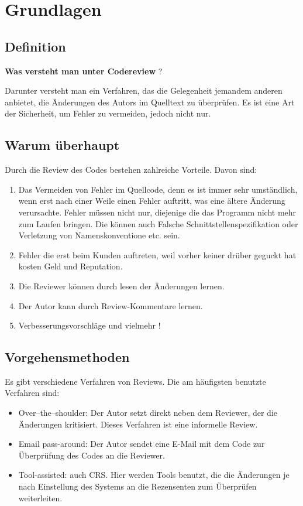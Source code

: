 \section{Grundlagen}

\subsection{Definition}

\textbf{Was versteht man unter Codereview} ?

Darunter versteht man ein Verfahren, das die Gelegenheit jemandem anderen anbietet, die Änderungen des Autors im Quelltext zu überprüfen.
Es ist eine Art der Sicherheit, um Fehler zu vermeiden, jedoch nicht nur.

\subsection{Warum überhaupt}
Durch die Review des Codes bestehen zahlreiche Vorteile. Davon sind:

\begin{enumerate}
\item Das Vermeiden von Fehler im Quellcode, denn es ist immer sehr umständlich, wenn erst nach einer Weile einen Fehler auftritt, was eine ältere Änderung verursachte.
	  Fehler müssen nicht nur, diejenige die das Programm nicht mehr zum Laufen bringen. Die können auch Falsche Schnittstellenspezifikation oder Verletzung von Namenskonventione 				  \ac{etc.} sein.
\item Fehler die erst beim Kunden auftreten, weil vorher keiner drüber geguckt hat kosten Geld und Reputation.
\item Die Reviewer können durch lesen der Änderungen lernen.
\item Der Autor kann durch Review-Kommentare lernen.
\item Verbesserungsvorschläge und vielmehr !
\end{enumerate}

\subsection{Vorgehensmethoden}
Es gibt verschiedene Verfahren von Reviews. Die am häufigsten benutzte Verfahren sind:

\begin{itemize}
\item Over–the–shoulder: Der Autor setzt direkt neben dem Reviewer, der die Änderungen kritisiert. Dieses Verfahren ist eine informelle Review.
\item Email pass-around: Der Autor sendet eine E-Mail mit dem Code zur Überprüfung des Codes an die Reviewer.
\item Tool-assisted: auch \ac{CRS}. Hier werden Tools benutzt, die die Änderungen je nach Einstellung des Systems an die Rezensenten zum Überprüfen weiterleiten.
\end{itemize}
